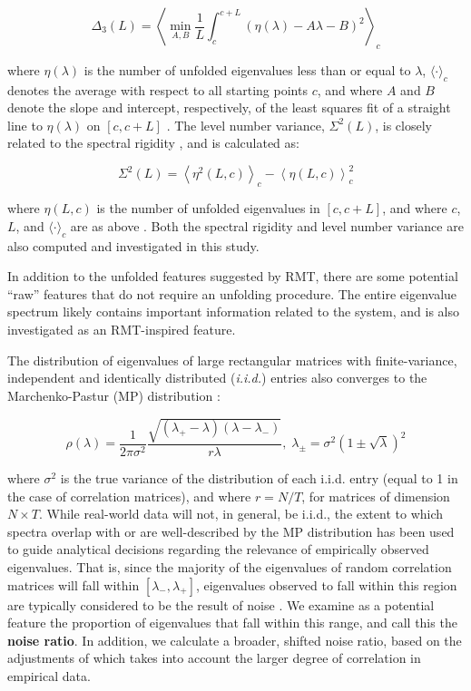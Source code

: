 \documentclass[10pt]{article}
\begin{document}
\[
\Delta_3(L) = \left \langle \min_{A,B} \frac{1}{L} \int_c^{c+L} \left(  \eta(\lambda) -A \lambda - B \right)^2 \right \rangle_c
\]

where \(\eta(\lambda)\) is the number of unfolded eigenvalues less than or equal to \(\lambda\),
\(\langle \cdot \rangle_c\) denotes the average with respect to all starting points \(c\), and where
\(A\) and \(B\) denote the slope and intercept, respectively, of the least squares fit of a straight
line to \(\eta(\lambda)\) on \([c, c+L]\) \citep{guhrRandommatrixTheoriesQuantum1998a}. The level
number variance, \(\Sigma^2(L)\), is closely related to the spectral rigidity
\citep{mehtaRandomMatrices2004}, and is calculated as:

\[
\Sigma^2(L) = \left\langle \eta^2(L, c) \right\rangle_c - \left\langle \eta(L, c) \right\rangle^2_c
\]

where \(\eta(L, c)\) is the number of unfolded eigenvalues in \([c, c+ L]\), and where \(c\), \(L\),
and \(\langle \cdot \rangle_c\) are as above \citep{guhrRandommatrixTheoriesQuantum1998a}. Both the
spectral rigidity and level number variance are also computed and investigated in this study.

In addition to the unfolded features suggested by RMT, there are some potential ``raw'' features that
do not require an unfolding procedure. The entire eigenvalue spectrum likely contains important
information related to the system, and is also investigated as an RMT-inspired feature.

The distribution of eigenvalues of large rectangular matrices with finite-variance, independent and
identically distributed (\textit{i.i.d.}) entries also converges to the Marchenko-Pastur (MP)
distribution \citep{marcenkoDISTRIBUTIONEIGENVALUESSETS1967,yaoLargeSampleCovariance2015}:

\[
\rho(\lambda) =
\frac{1}{2\pi\sigma^2}
\frac{\sqrt{(\lambda_+ - \lambda)(\lambda - \lambda_-)}}{r\lambda}, \;
\lambda_{\pm} = \sigma^2\left(1 \pm \sqrt{\lambda}\right)^2
\]

where \(\sigma^2\) is the true variance of the distribution of each i.i.d. entry (equal to 1 in the
case of correlation matrices), and where \(r = N / T\), for matrices of dimension \(N \times T\).
While real-world data will not, in general, be i.i.d., the extent to which spectra overlap with or
are well-described by the MP distribution has been used to guide analytical decisions regarding the
relevance of empirically observed eigenvalues. That is, since the majority of the eigenvalues of
random correlation matrices will fall within \([\lambda_{-}, \lambda_{+}]\), eigenvalues observed to
fall within this region are typically considered to be the result of noise
\citep{veraartDenoisingDiffusionMRI2016,veraartDiffusionMRINoise2016,ulfarssonDimensionEstimationNoisy2008,macmahonCommunityDetectionCorrelation2015}.
We examine as a potential feature the proportion of eigenvalues that fall within this range, and
call this the \textbf{noise ratio}. In addition, we calculate a broader, shifted noise ratio, based on the
adjustments of \cite{almogUncoveringFunctionalSignature2019} which takes into account the larger
degree of correlation in empirical data.
\end{document}
